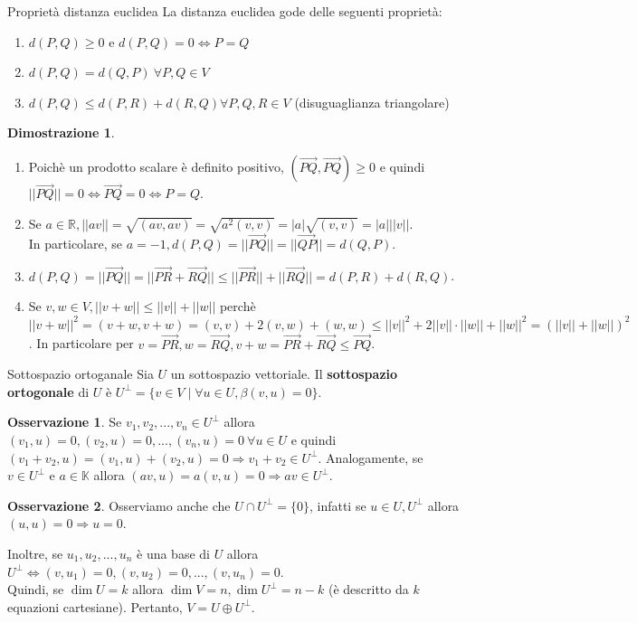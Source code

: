 \documentclass[a4paper]{article}
\theoremstyle{definition}
\newtheorem*{oss}{Osservazione}
\newtheorem*{dimm}{Dimostrazione}
\begin{document}
	\begin{teo}{Proprietà distanza euclidea}{}
		La distanza euclidea gode delle seguenti proprietà:
		\begin{enumerate}
			\item $d(P, Q) \ge 0$ e $d(P, Q) = 0 \Leftrightarrow P = Q$
			\item $d(P, Q) = d(Q, P) \ \forall P, Q \in V$
			\item $d(P, Q) \le d(P, R) + d(R, Q) \forall P, Q, R \in V$ (disuguaglianza triangolare)
		\end{enumerate}
	\end{teo}
	\begin{dimm}
		\begin{enumerate}
			\item Poichè un prodotto scalare è definito positivo, $(\overrightarrow{PQ}, \overrightarrow{PQ}) \ge 0$ e quindi $||\overrightarrow{PQ}|| = 0 \Leftrightarrow \overrightarrow{PQ} = 0 \Leftrightarrow P = Q$.
			\item Se $a \in \mathbb{R}, ||av|| = \sqrt{(av, av)} = \sqrt{a^2(v, v)} = |a|\sqrt{(v, v)} = |a|||v||$. \\
			In particolare, se $a = -1, d(P, Q) = ||\overrightarrow{PQ}|| = ||\overrightarrow{QP}|| = d(Q, P)$.
			\item $d(P, Q) = ||\overrightarrow{PQ}|| = ||\overrightarrow{PR} + \overrightarrow{RQ}|| \le ||\overrightarrow{PR}|| + ||\overrightarrow{RQ}|| = d(P, R) + d(R, Q)$.
			\item Se $v, w \in V, ||v+w|| \le ||v|| + ||w||$ perchè $||v+w||^2 = (v+w, v+w) = (v, v) + 2(v, w) + (w, w) \le ||v||^2 + 2||v||\cdot||w|| + ||w||^2 = (||v|| + ||w||)^2$.
			In particolare per $v = \overrightarrow{PR}, w = \overrightarrow{RQ}, v + w = \overrightarrow{PR} + \overrightarrow{RQ} \le \overrightarrow{PQ}$.
		\end{enumerate}
	\end{dimm}

	\begin{deff}{Sottospazio ortoganale}{}
		Sia $U$ un sottospazio vettoriale.
		Il \textbf{sottospazio ortogonale} di $U$ è $U^\perp = \{v \in V \mid \forall u \in U, \beta(v, u) = 0\}$.
	\end{deff}
	\begin{oss}
		Se $v_1, v_2, ..., v_n \in U^\perp$ allora $(v_1, u) = 0, (v_2, u) = 0, ..., (v_n, u) = 0 \ \forall u \in U$ e quindi $(v_1 + v_2, u) = (v_1, u) + (v_2, u) = 0 \Rightarrow v_1 + v_2 \in U^\perp$.
		Analogamente, se $v \in U^\perp$ e $a \in \mathbb{K}$ allora $(av, u) = a(v, u) = 0 \Rightarrow av \in U^\perp$.
	\end{oss}
	\begin{oss}
		Osserviamo anche che $U \cap U^\perp = \{0\}$, infatti se $u \in U, U^\perp$ allora $(u, u) = 0 \Rightarrow u = 0$.
	\end{oss}
	Inoltre, se $u_1, u_2, ..., u_n$ è una base di $U$ allora $U^\perp \Leftrightarrow (v, u_1) = 0, (v, u_2) = 0, ..., (v, u_n) = 0$. \\
	Quindi, se $\dim U = k$ allora $\dim V = n, \dim U^\perp = n - k$ (è descritto da $k$ equazioni cartesiane).
	Pertanto, $V = U \oplus U^\perp$.
\end{document}
